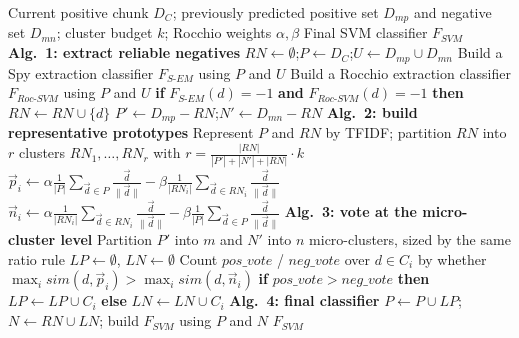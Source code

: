 \documentclass{article}
\begin{document}
\begin{algorithm}[!h]
\renewcommand{\algorithmicrequire}{\textbf{Input:}}
\renewcommand{\algorithmicensure}{\textbf{Output:}}
	\caption{LELC: extracting likely positive and negative micro-clusters for stream PU learning}
	\begin{algorithmic}[1]
	    \REQUIRE
	    Current positive chunk $D_{C}$; previously predicted positive set $D_{mp}$ and
	    negative set $D_{mn}$; cluster budget $k$; Rocchio weights $\alpha,\beta$
	    \ENSURE
	    Final SVM classifier $F_{SVM}$
	    \STATE \textbf{Alg.~1: extract reliable negatives}
	    \STATE $RN\leftarrow\emptyset$;\quad $P\leftarrow D_{C}$;\quad $U\leftarrow D_{mp}\cup D_{mn}$
	    \STATE Build a Spy extraction classifier $F_{S\text{-}EM}$ using $P$ and $U$
	    \STATE Build a Rocchio extraction classifier $F_{Roc\text{-}SVM}$ using $P$ and $U$
	    \STATE \textbf{if} $F_{S\text{-}EM}(d)=-1$ \textbf{and} $F_{Roc\text{-}SVM}(d)=-1$
	    \textbf{then} $RN\leftarrow RN\cup\{d\}$ %
	    \ENDFOR
	    \STATE $P'\leftarrow D_{mp}-RN$;\quad $N'\leftarrow D_{mn}-RN$
	    \STATE \textbf{Alg.~2: build representative prototypes}
	    \STATE Represent $P$ and $RN$ by TFIDF; partition $RN$ into $r$ clusters
	    $RN_{1},\dots,RN_{r}$ with $r=\frac{|RN|}{|P'|+|N'|+|RN|}\cdot k$ %
	    \STATE $\vec{p}_{i}\leftarrow \alpha\frac{1}{|P|}\sum_{\vec{d}\in P}\frac{\vec{d}}{\|\vec{d}\|}
	    -\beta\frac{1}{|RN_{i}|}\sum_{\vec{d}\in RN_{i}}\frac{\vec{d}}{\|\vec{d}\|}$
	    \STATE $\vec{n}_{i}\leftarrow \alpha\frac{1}{|RN_{i}|}\sum_{\vec{d}\in RN_{i}}\frac{\vec{d}}{\|\vec{d}\|}
	    -\beta\frac{1}{|P|}\sum_{\vec{d}\in P}\frac{\vec{d}}{\|\vec{d}\|}$ %
	    \ENDFOR
	    \STATE \textbf{Alg.~3: vote at the micro-cluster level}
	    \STATE Partition $P'$ into $m$ and $N'$ into $n$ micro-clusters, sized by the same ratio rule
	    \STATE $LP\leftarrow\emptyset$, $LN\leftarrow\emptyset$
	    \STATE Count $pos\_vote$ / $neg\_vote$ over $d\in C_{i}$ by whether
	    $\max_{i}sim(d,\vec{p}_{i})>\max_{i}sim(d,\vec{n}_{i})$
	    \STATE \textbf{if} $pos\_vote>neg\_vote$ \textbf{then} $LP\leftarrow LP\cup C_{i}$
	    \textbf{else} $LN\leftarrow LN\cup C_{i}$ %
	    \ENDFOR
	    \STATE \textbf{Alg.~4: final classifier}
	    \STATE $P\leftarrow P\cup LP$;\quad $N\leftarrow RN\cup LN$;\quad
	    build $F_{SVM}$ using $P$ and $N$
		\RETURN $F_{SVM}$
	\end{algorithmic}
\end{algorithm}
\end{document}
